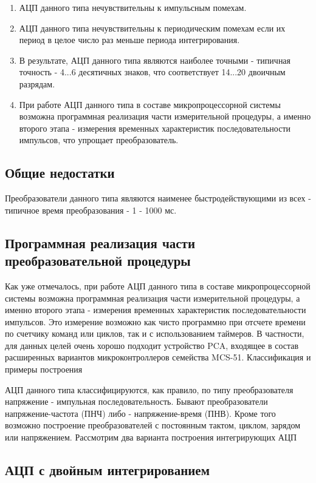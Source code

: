 \documentclass[unicode, 12pt, a4paper, oneside]{article}
\begin{document}
\begin{enumerate}
\item АЦП данного типа нечувствительны к импульсным помехам.
\item АЦП данного типа нечувствительны к периодическим помехам если их период в целое число раз меньше периода интегрирования.
\item В результате, АЦП данного типа являются наиболее точными - типичная точность - 4...6 десятичных знаков, что соответствует 14...20 двоичным разрядам.
\item При работе АЦП данного типа в составе микропроцессорной системы возможна программная реализация части измерительной процедуры, а именно второго этапа - измерения временных характеристик последовательности импульсов, что упрощает преобразователь.
\end{enumerate}

\subsection*{Общие недостатки}

Преобразователи данного типа являются наименее быстродействующими из всех - типичное время преобразования - 1 - 1000 мс.

\subsection*{Программная реализация части преобразовательной процедуры}

Как уже отмечалось, при работе АЦП данного типа в составе микропроцессорной системы возможна программная реализация части измерительной процедуры, а именно второго этапа - измерения временных характеристик последовательности импульсов. Это измерение возможно как чисто программно при отсчете времени по счетчику команд или циклов, так и с использованием таймеров. В частности, для данных целей очень хорошо подходит устройство PCA, входящее в состав расширенных вариантов микроконтроллеров семейства MCS-51.
Классификация и примеры построения

АЦП данного типа классифицируются, как правило, по типу преобразователя напряжение - импульная последовательность. Бывают преобразователи напряжение-частота (ПНЧ) либо - напряжение-время (ПНВ). Кроме того возможно построение преобразователей с постоянным тактом, циклом, зарядом или напряжением. Рассмотрим два варианта построения интегрирующих АЦП


\subsection*{АЦП с двойным интегрированием}
\end{document}
